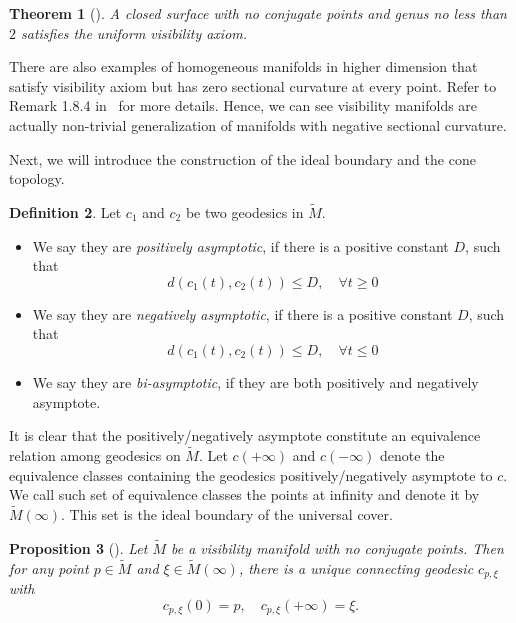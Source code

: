 \documentclass[reqno,11pt]{article}
\newtheorem{theorem}{Theorem}[section]
\newtheorem{proposition}[theorem]{Proposition}
\theoremstyle{definition}
\newtheorem{definition}[theorem]{Definition}
\theoremstyle{remark}
\numberwithin{equation}{section}
\begin{document}
\begin{theorem}[\cite{Eb1}]
	A closed surface with no conjugate points and genus no less than $2$ satisfies the uniform visibility axiom.\label{thm_2_4}
\end{theorem}

There are also examples of homogeneous manifolds in higher dimension that satisfy visibility axiom but has zero sectional curvature at every point. Refer to Remark 1.8.4 in~\cite{Eb4} for more details. Hence, we can see visibility manifolds are actually non-trivial generalization of manifolds with negative sectional curvature.

Next, we will introduce the construction of the ideal boundary and the cone topology.

\begin{definition}
	Let $c_1$ and $c_2$ be two geodesics in $\widetilde{M}$.
	\begin{itemize}
		\item We say they are \emph{positively asymptotic}, if there is a positive constant $D$, such that
		      \begin{displaymath}
			      d(c_1(t),c_2(t))\leq D, \quad\forall t\geq 0
		      \end{displaymath}
		\item We say they are \emph{negatively asymptotic}, if there is a positive constant $D$, such that
		      \begin{displaymath}
			      d(c_1(t),c_2(t))\leq D, \quad\forall t\leq 0
		      \end{displaymath}
		\item We say they are \emph{bi-asymptotic}, if they are both positively and negatively asymptote.
	\end{itemize}
\end{definition}

It is clear that the positively/negatively asymptote constitute an equivalence relation among geodesics on $\widetilde{M}$. Let $c(+\infty)$ and $c(-\infty)$ denote the equivalence classes containing the geodesics positively/negatively asymptote to $c$. We call such set of equivalence classes the points at infinity and denote it by $\widetilde{M}(\infty)$. This set is the ideal boundary of the universal cover.


\begin{proposition}[\cite{Eb1}]\label{prop_2_6}
    Let $\widetilde{M}$ be a visibility manifold with no conjugate points. Then for any point $p\in\widetilde{M}$ and $\xi\in\widetilde{M}(\infty)$, there is a unique connecting geodesic $c_{p,\xi}$ with 
    \begin{displaymath}
        c_{p,\xi}(0)=p,\quad c_{p,\xi}(+\infty)=\xi.
    \end{displaymath}
\end{proposition}
\end{document}

